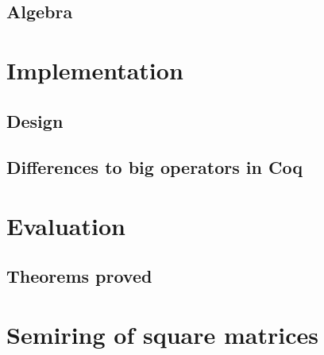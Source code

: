 \section{Algebra}

\chapter{Implementation}

\section{Design}

\section{Differences to big operators in Coq}

\chapter{Evaluation}

\section{Theorems proved}

\appendix

\chapter{Semiring of square matrices}


